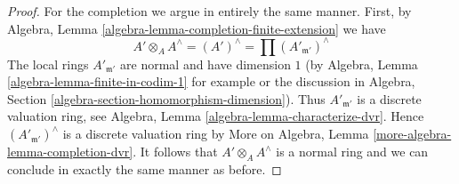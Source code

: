 \begin{proof}
\medskip\noindent
For the completion we argue in entirely the same manner. First,
by Algebra, Lemma \ref{algebra-lemma-completion-finite-extension} we have
$$
A' \otimes_A A^\wedge = (A')^\wedge =
\prod\nolimits (A'_{\mathfrak m'})^\wedge
$$
The local rings $A'_{\mathfrak m'}$ are normal and have dimension $1$
(by Algebra, Lemma \ref{algebra-lemma-finite-in-codim-1} for example or
the discussion in
Algebra, Section \ref{algebra-section-homomorphism-dimension}).
Thus $A'_{\mathfrak m'}$ is a discrete valuation ring, see
Algebra, Lemma \ref{algebra-lemma-characterize-dvr}.
Hence $(A'_{\mathfrak m'})^\wedge$ is a discrete valuation ring
by More on Algebra, Lemma \ref{more-algebra-lemma-completion-dvr}.
It follows that $A' \otimes_A A^\wedge$ is a normal ring and
we can conclude in exactly the same manner as before.
\end{proof}
